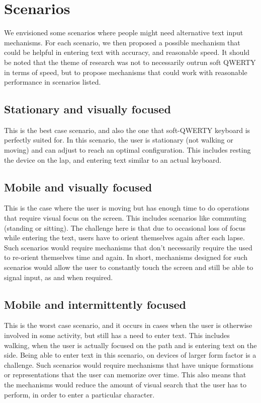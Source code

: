 \section{Scenarios}
We envisioned some scenarios where people might need alternative text input mechanisms. For each scenario, we then proposed a possible mechanism that could be helpful in entering text with accuracy, and reasonable speed. It should be noted that the theme of research was not to necessarily outrun soft QWERTY in terms of speed, but to propose mechanisms that could work with reasonable performance in scenarios listed. 
\subsection{Stationary and visually focused}
This is the best case scenario, and also the one that soft-QWERTY keyboard is perfectly suited for. In this scenario, the user is stationary (not walking or moving) and can adjust to reach an optimal configuration. This includes resting the device on the lap, and entering text similar to an actual keyboard.
\subsection{Mobile and visually focused}
This is the case where the user is moving but has enough time to do operations that require visual focus on the screen. This includes scenarios like commuting (standing or sitting). The challenge here is that due to occasional loss of focus while entering the text, users have to orient themselves again after each lapse. Such scenarios would require mechanisms that don't necessarily require the used to re-orient themselves time and again. In short, mechanisms designed for such scenarios would allow the user to constantly touch the screen and still be able to signal input, as and when required. 
\subsection{Mobile and intermittently focused}
This is the worst case scenario, and it occurs in cases when the user is otherwise involved in some activity, but still has a need to enter text. This includes walking, when the user is actually focused on the path and is entering text on the side. Being able to enter text in this scenario, on devices of larger form factor is a challenge. Such scenarios would require mechanisms that have unique formations or representations that the user can memorize over time. This also means that the mechanisms would reduce the amount of visual search that the user has to perform, in order to enter a particular character. 
 
